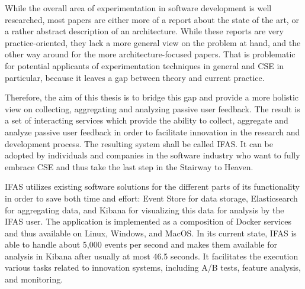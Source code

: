 While the overall area of experimentation in software development is well researched, most papers are either more of a report about the state of the art, or a rather abstract description of an architecture.
While these reports are very practice-oriented, they lack a more general view on the problem at hand, and the other way around for the more architecture-focused papers.
That is problematic for potential applicants of experimentation techniques in general and \ac{CSE} in particular, because it leaves a gap between theory and current practice.

Therefore, the aim of this thesis is to bridge this gap and provide a more holistic view on collecting, aggregating and analyzing passive user feedback.
%
The result is a set of interacting services which provide the ability to collect, aggregate and analyze passive user feedback in order to facilitate innovation in the research and development process.
The resulting system shall be called \ac{IFAS}.
It can be adopted by individuals and companies in the software industry who want to fully embrace \ac{CSE} and thus take the last step in the Stairway to Heaven.

\ac{IFAS} utilizes existing software solutions for the different parts of its functionality in order to save both time and effort:
Event Store for data storage, Elasticsearch for aggregating data, and Kibana for visualizing this data for analysis by the \ac{IFAS} user.
The application is implemented as a composition of Docker services and thus available on Linux, Windows, and MacOS.
In its current state, \ac{IFAS} is able to handle about 5,000 events per second and makes them available for analysis in Kibana after usually at most 46.5 seconds.
It facilitates the execution various tasks related to innovation systems, including A/B tests, feature analysis, and monitoring.

